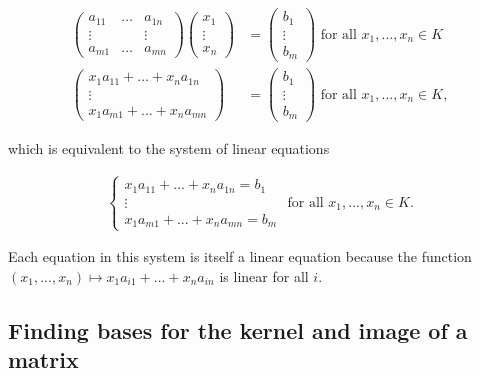 \begin{deriv}
    \begin{align*}
        \begin{pmatrix}
            a_{11} & \hdots & a_{1n} \\
            \vdots & & \vdots \\
            a_{m1} & \hdots & a_{mn}
        \end{pmatrix}
        \begin{pmatrix}
            x_1 \\ \vdots \\ x_n
        \end{pmatrix}
        &=
        \begin{pmatrix}
            b_1 \\ \vdots \\ b_m
        \end{pmatrix}
        \text{ for all $x_1, ..., x_n \in K$}
        \\
        \begin{pmatrix}
            x_1 a_{11} + ... + x_n a_{1n} \\
            \vdots \\
            x_1 a_{m1} + ... + x_n a_{mn}
        \end{pmatrix}
        &=
        \begin{pmatrix}
            b_1 \\ \vdots \\ b_m
        \end{pmatrix}
        \text{ for all $x_1, ..., x_n \in K$},
    \end{align*}

    which is equivalent to the system of linear equations

    \begin{align*}
        \begin{cases}
            x_1 a_{11} + ... + x_n a_{1n} = b_1 \\
            \vdots \\
            x_1 a_{m1} + ... + x_n a_{mn} = b_m
        \end{cases}
        \text{ for all $x_1, ..., x_n \in K$}.
    \end{align*}

    Each equation in this system is itself a linear equation because the function $(x_1, ..., x_n) \mapsto x_1 a_{i1} + ... + x_n a_{in}$ is linear for all $i$.
\end{deriv}

\subsection*{Finding bases for the kernel and image of a matrix}

